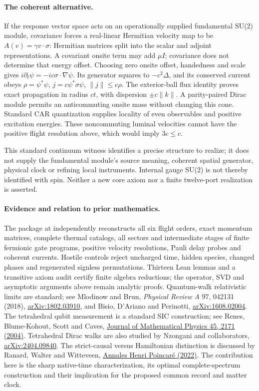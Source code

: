 \paragraph{The coherent alternative.}
If the response vector space acts on an operationally supplied fundamental
SU(2) module, covariance forces a real-linear Hermitian velocity map to be
$A(v)=\gamma v\cdot\sigma$: Hermitian matrices split into the scalar and
adjoint representations. A covariant onsite term may add $\mu I$;
covariance does not determine that energy offset. Choosing zero onsite
offset, handedness and scale gives
$i\partial_t\psi=-ic\sigma\cdot\nabla\psi$. Its generator squares
to $-c^2\Delta$, and its conserved current obeys
$\rho=\psi^*\psi$, $j=c\psi^*\sigma\psi$, $\|j\|\leq c\rho$.
The exterior-ball flux identity proves exact propagation in radius $ct$,
with dispersion $\pm c\|k\|$. A parity-paired Dirac module permits an
anticommuting onsite mass without changing this cone. Standard CAR
quantization supplies locality of even observables and positive excitation
energies. These noncommuting luminal velocities cannot have the positive
flight resolution above, which would imply $3c\leq c$.

This standard continuum witness identifies a precise structure to realize;
it does not supply the fundamental module's source meaning, coherent
spatial generator, physical clock or refining local instruments. Internal
gauge SU(2) is not thereby identified with spin. Neither a new core axiom
nor a finite twelve-port realization is asserted.

\paragraph{Evidence and relation to prior mathematics.}
The package at  independently reconstructs
all six flight orders, exact momentum matrices, complete thermal catalogs,
all sectors and intermediate stages of finite fermionic gate programs,
positive velocity resolutions, Pauli delay probes and coherent currents.
Hostile controls reject uncharged time, hidden species, changed phases and
regenerated signless permutations. Thirteen Lean lemmas and a transitive axiom
audit certify finite algebra reductions; the operator, SVD and asymptotic
arguments above remain analytic proofs.
Quantum-walk relativistic limits are standard; see Mlodinow and Brun,
\emph{Physical Review A} 97, 042131 (2018),
\href{https://arxiv.org/abs/1802.03910}{arXiv:1802.03910}, and Bisio,
D'Ariano and Perinotti,
\href{https://arxiv.org/abs/1608.02004}{arXiv:1608.02004}.
The tetrahedral qubit measurement is a standard SIC construction; see
Renes, Blume-Kohout, Scott and Caves,
\href{https://arxiv.org/abs/quant-ph/0310075}{Journal of Mathematical Physics 45, 2171 (2004)}.
Tetrahedral Dirac walks are also studied by Nzongani and collaborators,
\href{https://arxiv.org/abs/2404.09840}{arXiv:2404.09840}.
The strict-causal versus Hamiltonian distinction is discussed by Ranard,
Walter and Witteveen,
\href{https://doi.org/10.1007/s00023-022-01193-x}{Annales Henri Poincar\'e (2022)}.
The contribution here is the sharp native-time characterization, its
optimal complete-spectrum construction and their implication for the
proposed common record and matter clock.
